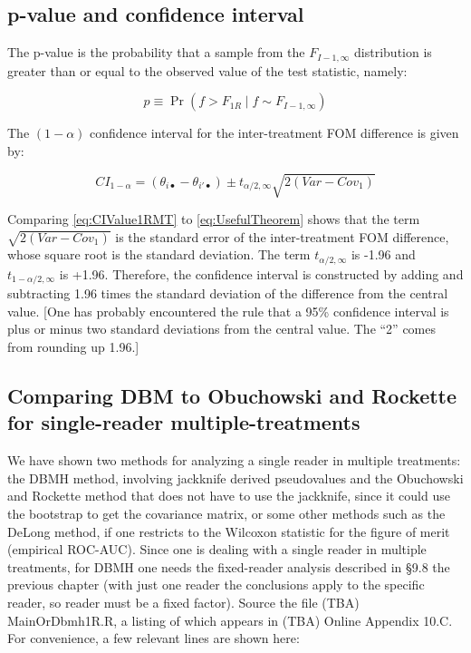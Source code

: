 \documentclass[
]{book}
\begin{document}
\hypertarget{p-value-and-confidence-interval}{%
\subsection{p-value and confidence interval}\label{p-value-and-confidence-interval}}

The p-value is the probability that a sample from the \(F_{I-1,\infty}\) distribution is greater than or equal to the observed value of the test statistic, namely:

\begin{equation}
p\equiv \Pr(f>F_{1R} \mid f \sim F_{I-1,\infty})
\label{eq:pValue1RMT}
\end{equation}

The \((1-\alpha)\) confidence interval for the inter-treatment FOM difference is given by:

\begin{equation}
CI_{1-\alpha} = (\theta_{i\bullet} - \theta_{i'\bullet}) \pm t_{\alpha/2,\infty} \sqrt{2(Var-Cov_1)}
\label{eq:CIValue1RMT}
\end{equation}

Comparing \eqref{eq:CIValue1RMT} to \eqref{eq:UsefulTheorem} shows that the term \(\sqrt{2(Var-Cov_1)}\) is the standard error of the inter-treatment FOM difference, whose square root is the standard deviation. The term \(t_{\alpha/2,\infty}\) is -1.96 and \(t_{1-\alpha/2,\infty}\) is +1.96. Therefore, the confidence interval is constructed by adding and subtracting 1.96 times the standard deviation of the difference from the central value. {[}One has probably encountered the rule that a 95\% confidence interval is plus or minus two standard deviations from the central value. The ``2'' comes from rounding up 1.96.{]}

\hypertarget{comparing-dbm-to-obuchowski-and-rockette-for-single-reader-multiple-treatments}{%
\subsection{Comparing DBM to Obuchowski and Rockette for single-reader multiple-treatments}\label{comparing-dbm-to-obuchowski-and-rockette-for-single-reader-multiple-treatments}}

We have shown two methods for analyzing a single reader in multiple treatments: the DBMH method, involving jackknife derived pseudovalues and the Obuchowski and Rockette method that does not have to use the jackknife, since it could use the bootstrap to get the covariance matrix, or some other methods such as the DeLong method, if one restricts to the Wilcoxon statistic for the figure of merit (empirical ROC-AUC). Since one is dealing with a single reader in multiple treatments, for DBMH one needs the fixed-reader analysis described in §9.8 the previous chapter (with just one reader the conclusions apply to the specific reader, so reader must be a fixed factor). Source the file (TBA) MainOrDbmh1R.R, a listing of which appears in (TBA) Online Appendix 10.C. For convenience, a few relevant lines are shown here:
\end{document}
